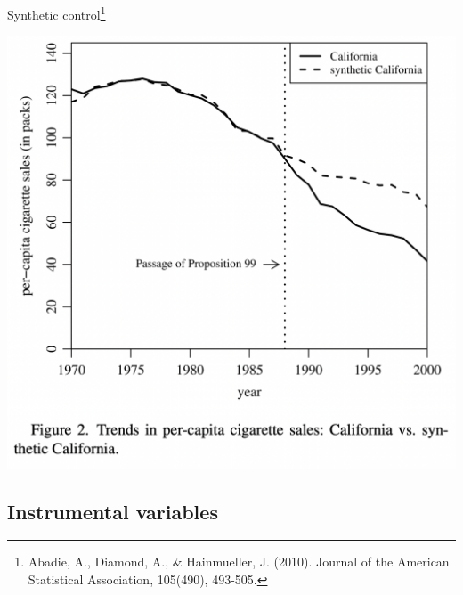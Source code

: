 \documentclass{beamer}
\newcommand\bref[2]{\href{#1}{\color{blue}{#2}}}
\begin{document}
\begin{frame}{Synthetic control\footnote{Abadie, A., Diamond, A., \& Hainmueller, J. (2010). \bref{http://www.jenshainmueller.de/Paper/ccs.pdf}{Synthetic control methods for comparative case studies: Estimating the effect of California’s tobacco control program.} Journal of the American Statistical Association, 105(490), 493-505.}}

\centering
\includegraphics[height = .6\textheight]{figures/synth_fig2}

\end{frame}


\subsection{Instrumental variables}
\end{document}

